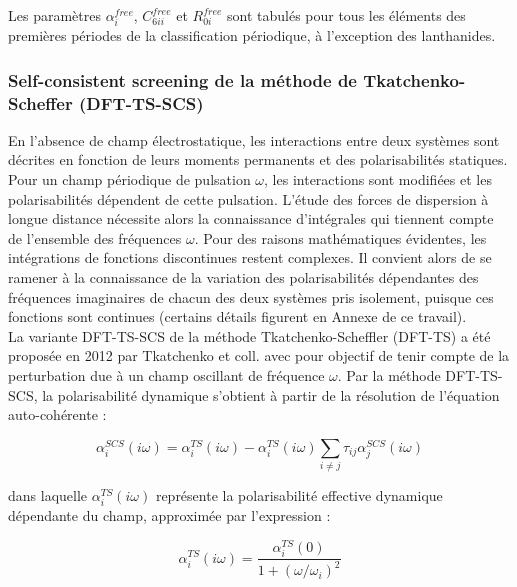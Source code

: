 {	Les paramètres $\alpha_{i}^{free}$, $C_{6ii}^{free}$ et $R_{0i}^{free}$ sont tabulés pour tous les éléments des premières périodes de la classification périodique, à l'exception des lanthanides.
	
	
	\subsubsection{Self-consistent screening de la méthode de Tkatchenko-Scheffer (DFT-TS-SCS)}
	
	En l'absence de champ électrostatique, les interactions entre deux systèmes sont décrites en fonction de leurs moments permanents et des polarisabilités statiques. Pour un champ périodique de pulsation $\omega$, les interactions sont modifiées et les polarisabilités dépendent de cette pulsation. L'étude des forces de dispersion à longue distance nécessite alors la connaissance d'intégrales qui tiennent compte de l'ensemble des fréquences $\omega$. Pour des raisons mathématiques évidentes, les intégrations de fonctions discontinues restent complexes. Il convient alors de se ramener à la connaissance de la variation des polarisabilités dépendantes des fréquences imaginaires de chacun des deux systèmes pris isolement, puisque ces fonctions sont continues (certains détails figurent en Annexe de ce travail). \\
	
	La variante DFT-TS-SCS de la méthode Tkatchenko-Scheffler (DFT-TS) a été proposée en 2012 par Tkatchenko et coll.\cite{tkatchenko2012accurate} avec pour objectif de tenir compte de la perturbation due à un champ oscillant de fréquence $\omega$. Par la méthode DFT-TS-SCS, la polarisabilité dynamique s'obtient à partir de la résolution de l’équation auto-cohérente :
	
	\begin{equation}
	\alpha_{i}^{SCS}(i \omega) = \alpha_{i}^{TS}(i \omega) - \alpha_{i}^{TS}(i \omega) \sum_{i\neq j} \tau_{ij} \alpha_{j}^{SCS}(i \omega)
	\end{equation} 
	
	dans laquelle $\alpha_{i}^{TS}(i \omega)$ représente la polarisabilité effective dynamique dépendante du champ, approximée par l’expression : 
	
	\begin{equation}
	\alpha_{i}^{TS}(i \omega) = \frac{\alpha_{i}^{TS}(0)}{1 + (\omega/\omega_{i})^{2}}
	\end{equation}
	
}
